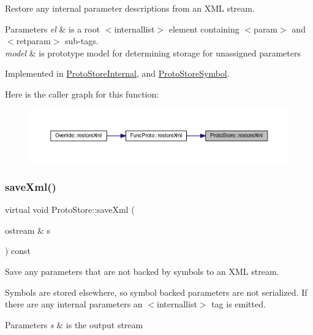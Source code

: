 Restore any internal parameter descriptions from an X\+ML stream. 


\begin{DoxyParams}{Parameters}
{\em el} & is a root $<$internallist$>$ element containing $<$param$>$ and $<$retparam$>$ sub-\/tags. \\
\hline
{\em model} & is prototype model for determining storage for unassigned parameters \\
\hline
\end{DoxyParams}


Implemented in \mbox{\hyperlink{class_proto_store_internal_ae1c3cd409eda277f1ff924cf858eddef}{Proto\+Store\+Internal}}, and \mbox{\hyperlink{class_proto_store_symbol_a6438185b37fc367226073f194a38d110}{Proto\+Store\+Symbol}}.

Here is the caller graph for this function\+:
\nopagebreak
\begin{figure}[H]
\begin{center}
\leavevmode
\includegraphics[width=350pt]{class_proto_store_a7311214c33205be191361836d716f99b_icgraph}
\end{center}
\end{figure}
\mbox{\label{class_proto_store_ac6e8cc6bfcb10d84a69c3f6011c5de06}} 
\subsubsection{\texorpdfstring{saveXml()}{saveXml()}}
{\footnotesize\ttfamily virtual void Proto\+Store\+::save\+Xml (\begin{DoxyParamCaption}\item[{ostream \&}]{s }\end{DoxyParamCaption}) const\hspace{0.3cm}{\ttfamily [pure virtual]}}



Save any parameters that are not backed by symbols to an X\+ML stream. 

Symbols are stored elsewhere, so symbol backed parameters are not serialized. If there are any internal parameters an $<$internallist$>$ tag is emitted. 
\begin{DoxyParams}{Parameters}
{\em s} & is the output stream \\
\hline
\end{DoxyParams}


